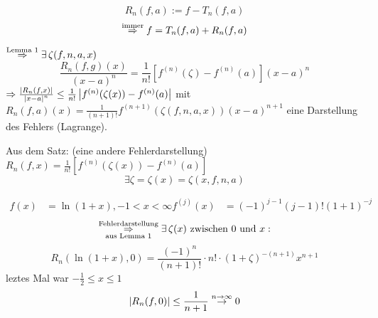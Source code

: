 \documentclass[../ana2.tex]{subfiles}
\begin{document}
\[ R_n(f,a) := f - T_n(f, a) \]
\[ \overset{\text{immer}}{\Rightarrow} f = T_n(f,a) + R_n(f,a) \]



\( \oversett{Lemma 1}{\Rightarrow} \exists \zeta(f,n,a,x) \)
\[ \frac{ R_n(f,g)(x) }{(x-a)^n} = \frac{1}{n!} 
[f^{(n)}(\zeta) - f^{(n)}(a)] (x-a)^n \]
\( \Rightarrow \frac{ \left|R_n(f, x)\right| }{ \left|x-a\right|^n } 
\leq \frac{1}{n!} \left| f^{(n)}(\zeta(x)) - f^{(n)}(a) \right| \)
mit \( R_n(f,a)(x) = \frac{1}{(n+1)!} 
f^{(n+1)}(\zeta(f,n,a,x)) (x-a)^{n+1} \) eine Darstellung 
des Fehlers (Lagrange).

Aus dem Satz: (eine andere Fehlerdarstellung)
\( R_n(f,x) = \frac{1}{n!} [f^{(n)}(\zeta(x)) - f^{(n)}(a)] \)
\[ \exists \zeta = \zeta(x) = \zeta(x,f,n,a) \]

\begin{bsp}
    \begin{align*}
        f(x) &= \ln(1+x), -1 < x < \infty
        f^{(j)}(x) &= (-1)^{j-1}(j-1)!(1+1)^{-j}        
    \end{align*}    
    \[ \overundersett{Fehlerdarstellung}{aus Lemma 1}{\Rightarrow} 
    \exists \zeta(x) \text{ zwischen } 0 \text{ und } x: \]
    \[ R_n(\ln(1+x),0) = \frac{(-1)^n}{(n+1)!} \cdot n! 
    \cdot (1+\zeta)^{-(n+1)}x^{n+1} \]
    leztes Mal war \( -\frac{1}{2} \leq x \leq 1 \)
    \[ \left|R_n(f, 0)\right| \leq \frac{1}{n+1} \overset{n \rightarrow \infty}{\rightarrow} 0\]
\end{bsp}
\end{document}
